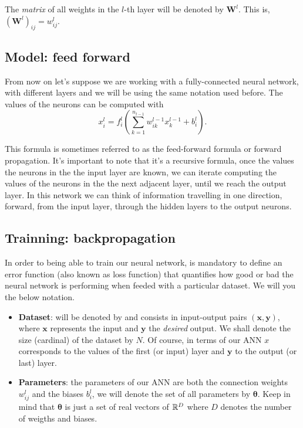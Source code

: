 The \emph{matrix} of all weights in the \(l\)-th layer will be denoted by
\(\mathbf{W}^l\). This is, \((\mathbf{W}^l)_{ij} = w_{ij}^l\).

\subsection{Model: feed forward}
\label{subsec:forward}

From now on let's suppose we are working with a fully-connected neural network,
with different layers and we will be using the same notation used before. The
values of the neurons can be computed with
\begin{equation}
  x_i^l = f_i^l \left( \sum_{k=1}^{n_{l-1}} w_{ik}^{l-1} x_{k}^{l-1} + b_i^l \right).
\end{equation}

This formula is sometimes referred to as the feed-forward formula or forward
propagation. It's important to note that it's a recursive formula, once the
values the neurons in the the input layer are known, we can iterate computing
the values of the neurons in the the next adjacent layer, until we reach the
output layer. In this network we can think of information travelling in one
direction, forward, from the input layer, through the hidden layers to the
output neurons.

\subsection{Trainning: backpropagation}
\label{sec:backward}

In order to being able to train our neural network, is mandatory to define an
error function (also known as loss function) that quantifies how good or bad
the neural network is performing when feeded with a particular dataset. We will
you the below notation.
\begin{itemize}
  \item \textbf{Dataset}: will be denoted by and consists in input-output pairs
  \((\mathbf{x}, \mathbf{y})\), where \(\mathbf{x}\) represents the input and
  \(\mathbf{y}\) the \emph{desired} output. We shall denote the size (cardinal)
  of the dataset by \(N\). Of course, in terms of our ANN \(x\) corresponds to
  the values of the first (or input) layer and \(\mathbf{y}\) to the output (or
  last) layer.
  \item \textbf{Parameters}: the parameters of our ANN are both the connection
  weights \(w_{ij}^l\) and the biases \(b_i^l\), we will denote the set of all
  parameters by \(\bm{\theta}\). Keep in mind that \(\bm{\theta}\) is just a
  set of real vectors of \(\mathbb{R}^D\) where \(D\) denotes the number of weigths and
  biases.
\end{itemize}

